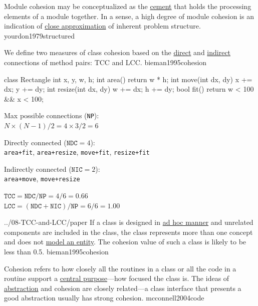 \documentclass{article}
\begin{document}

  {Module cohesion may be conceptualized as the \ul{cement} that holds the processing elements of a module together. In a sense, a high degree of module cohesion is an indication of \ul{close approximation} of inherent problem structure.}
  {yourdon1979structured}

  {We define two measures of class cohesion based on the \ul{direct} and \ul{indirect} connections of method pairs: TCC and LCC.}
  {bieman1995cohesion}

\begin{multicols}{2}
{\small\begin{ffcode}
class Rectangle
  int x, y, w, h;
  int area()
    return w * h;
  int move(int dx, dy)
    x += dx; y += dy;
  int resize(int dx, dy)
    w += dx; h += dy;
  bool fit()
    return w < 100
      && x < 100;
\end{ffcode}
}
\par\columnbreak\par
Max possible connections (\texttt{NP}): \\
\( N \times (N-1) / 2 = 4 \times 3 / 2 = 6\)
\par
Directly connected (\(\texttt{NDC}=4\)): \\
\texttt{area+fit}, \texttt{area+resize}, \texttt{move+fit}, \texttt{resize+fit}
\par
Indirectly connected (\(\texttt{NIC}=2\)): \\
\texttt{area+move}, \texttt{move+resize}
\par
\(\texttt{TCC} = \texttt{NDC} / \texttt{NP} = 4/6 = 0.66 \) \\
\(\texttt{LCC} = (\texttt{NDC} + \texttt{NIC}) / \texttt{NP} = 6/6 = 1.00 \) \\
\end{multicols}
\plush{}

\qte
  {../08-TCC-and-LCC/paper}
  {If a class is designed in \ul{ad hoc manner} and unrelated components are included in the class, the class represents more than one concept and does not \ul{model an entity}. The cohesion value of such a class is likely to be less than 0.5.}
  {bieman1995cohesion}

  {Cohesion refers to how closely all the routines in a class or all the code in a routine support a \ul{central purpose}---how focused the class is. The ideas of \ul{abstraction} and cohesion are closely related---a class interface that presents a good abstraction usually has strong cohesion.}
  {mcconnell2004code}
\end{document}
